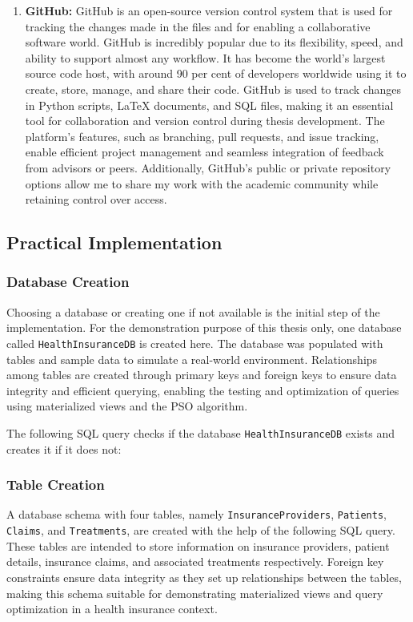 \begin{enumerate}[label=(\roman*)]
\item\textbf{GitHub:} GitHub is an open-source version control system that is used for tracking the changes made in the files and for enabling a collaborative software world. GitHub is incredibly popular due to its flexibility, speed, and ability to support almost any workflow. It has become the world's largest source code host, with around 90 per cent of developers worldwide using it to create, store, manage, and share their code. GitHub is used to track changes in Python scripts, LaTeX documents, and SQL files, making it an essential tool for collaboration and version control during thesis development. The platform’s features, such as branching, pull requests, and issue tracking, enable efficient project management and seamless integration of feedback from advisors or peers. Additionally, GitHub’s public or private repository options allow me to share my work with the academic community while retaining control over access.

\end{enumerate}

\clearpage

\subsection{Practical Implementation }

\subsubsection{Database Creation}
Choosing a database or creating one if not available is the initial step of the implementation. For the demonstration purpose of this thesis only, one database called \texttt{HealthInsuranceDB} is created here. The database was populated with tables and sample data to simulate a real-world environment. Relationships among tables are created through primary keys and foreign keys to ensure data integrity and efficient querying, enabling the testing and optimization of queries using materialized views and the PSO algorithm.

The following SQL query checks if the database \texttt{HealthInsuranceDB} exists and creates it if it does not: \vspace{.4cm}




\subsubsection{Table Creation} A database schema with four tables, namely \texttt{InsuranceProviders}, \texttt{Patients}, \texttt{Claims}, and \texttt{Treatments}, are created with the help of the following SQL query. These tables are intended to store information on insurance providers, patient details, insurance claims, and associated treatments respectively. Foreign key constraints ensure data integrity as they set up relationships between the tables, making this schema suitable for demonstrating materialized views and query optimization in a health insurance context. \vspace{.4cm}

